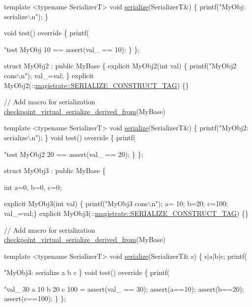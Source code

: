 \begin{DoxyCodeInclude}
{  \textcolor{keyword}{template} <\textcolor{keyword}{typename} SerializerT>
  \textcolor{keywordtype}{void} \hyperlink{namespacecheckpoint_a075da4e7344cf037943362517e606c3a}{serialize}(SerializerT&) \{
    printf(\textcolor{stringliteral}{"MyObj: serialize\(\backslash\)n"});
  \}

  \textcolor{keywordtype}{void} test()\textcolor{keyword}{ override }\{
    printf(\textcolor{stringliteral}{"test MyObj 10 == %
    assert(val\_ == 10);
  \}
\};

\textcolor{keyword}{struct }MyObj2 : \textcolor{keyword}{public} MyBase \{
  \textcolor{keyword}{explicit} MyObj2(\textcolor{keywordtype}{int} val) \{ printf(\textcolor{stringliteral}{"MyObj2 cons\(\backslash\)n"}); val\_=val; \}
  \textcolor{keyword}{explicit} MyObj2(::\hyperlink{structcheckpoint_1_1dispatch_1_1_s_e_r_i_a_l_i_z_e___c_o_n_s_t_r_u_c_t___t_a_g}{magistrate::SERIALIZE\_CONSTRUCT\_TAG}) \{\}

  \textcolor{comment}{// Add macro for serialization}
  \hyperlink{derived_8h_acc015406441054fae32d63af2b86ca0d}{checkpoint\_virtual\_serialize\_derived\_from}(MyBase)

  \textcolor{keyword}{template} <\textcolor{keyword}{typename} SerializerT>
  \textcolor{keywordtype}{void} \hyperlink{namespacecheckpoint_a075da4e7344cf037943362517e606c3a}{serialize}(SerializerT&) \{
    printf(\textcolor{stringliteral}{"MyObj2: serialize\(\backslash\)n"});
  \}
  \textcolor{keywordtype}{void} test()\textcolor{keyword}{ override }\{
    printf(\textcolor{stringliteral}{"test MyObj2 20 == %
    assert(val\_ == 20);
  \}
\};

\textcolor{keyword}{struct }MyObj3 : \textcolor{keyword}{public} MyBase \{

  \textcolor{keywordtype}{int} a=0, b=0, c=0;

  \textcolor{keyword}{explicit} MyObj3(\textcolor{keywordtype}{int} val) \{ printf(\textcolor{stringliteral}{"MyObj3 cons\(\backslash\)n"}); a= 10; b=20; c=100; val\_=val;\}
  \textcolor{keyword}{explicit} MyObj3(::\hyperlink{structcheckpoint_1_1dispatch_1_1_s_e_r_i_a_l_i_z_e___c_o_n_s_t_r_u_c_t___t_a_g}{magistrate::SERIALIZE\_CONSTRUCT\_TAG}) \{\}

  \textcolor{comment}{// Add macro for serialization}
  \hyperlink{derived_8h_acc015406441054fae32d63af2b86ca0d}{checkpoint\_virtual\_serialize\_derived\_from}(MyBase)

  \textcolor{keyword}{template} <\textcolor{keyword}{typename} SerializerT>
  \textcolor{keywordtype}{void} \hyperlink{namespacecheckpoint_a075da4e7344cf037943362517e606c3a}{serialize}(SerializerT& s) \{
    s|a|b|c;
    printf(\textcolor{stringliteral}{"MyObj3: serialize a b c %
  \}
  \textcolor{keywordtype}{void} test()\textcolor{keyword}{ override }\{
    printf(\textcolor{stringliteral}{"val\_ 30  a 10 b 20 c 100 = %
    assert(val\_ == 30);
    assert(a==10);
    assert(b==20);
    assert(c==100);
  \}
\};

}}}}}
\end{DoxyCodeInclude}
